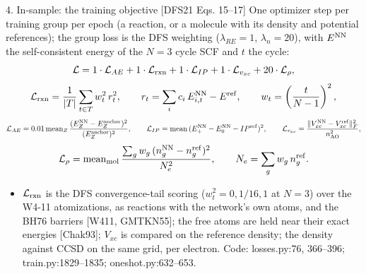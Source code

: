 \begin{frame}{4. In-sample: the training objective [DFS21 Eqs. 15--17]}
  \small
  One optimizer step per training group per epoch (a reaction, or a molecule with its density and potential references); the group loss is the DFS weighting ($\lambda_{RE} = 1$, $\lambda_n = 20$), with $E^{\rm NN}$ the self-consistent energy of the $N = 3$ cycle SCF and $t$ the cycle:
  \[
  \mathcal{L} = 1\cdot\mathcal{L}_{AE} + 1\cdot\mathcal{L}_{\rm rxn} + 1\cdot\mathcal{L}_{IP} + 1\cdot\mathcal{L}_{v_{xc}} + 20\cdot\mathcal{L}_{\rho},
  \]
  \[
  \mathcal{L}_{\rm rxn} = \frac{1}{|T|}\sum_{t\in T} w_t^2\, r_t^2, \qquad
  r_t = \sum_i c_i\, E^{\rm NN}_{i,t} - E^{\rm ref}, \qquad
  w_t = \left(\frac{t}{N-1}\right)^2,
  \]
  \[
  \mathcal{L}_{AE} = 0.01\,\mathrm{mean}_Z\, \frac{(E_Z^{\rm NN} - E_Z^{\rm anchor})^2}{(E_Z^{\rm anchor})^2}, \qquad
  \mathcal{L}_{IP} = \mathrm{mean}\,(E^{\rm NN}_{+} - E^{\rm NN}_0 - IP^{\rm ref})^2, \qquad
  \mathcal{L}_{v_{xc}} = \frac{\|V_{xc}^{\rm NN} - V_{xc}^{\rm ref}\|_F^2}{n_{\rm AO}^2},
  \]
  \[
  \mathcal{L}_{\rho} = \mathrm{mean}_{\rm mol}\,\frac{\sum_g w_g\,(n^{\rm NN}_g - n^{\rm ref}_g)^2}{N_e^2}, \qquad N_e = \sum_g w_g\, n^{\rm ref}_g .
  \]
  \begin{itemize}
    \item $\mathcal{L}_{\rm rxn}$ is the DFS convergence-tail scoring ($w_t^2 = 0, 1/16, 1$ at $N = 3$) over the W4-11 atomizations, as reactions with the network's own atoms, and the BH76 barriers [W411, GMTKN55]; the free atoms are held near their exact energies [Chak93]; $V_{xc}$ is compared on the reference density; the density against CCSD on the same grid, per electron. Code: losses.py:76, 366--396; train.py:1829--1835; oneshot.py:632--653.
  \end{itemize}
\end{frame}
